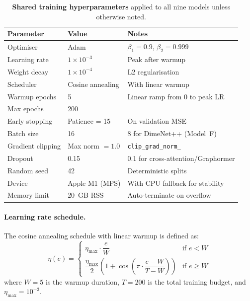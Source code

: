 \documentclass[11pt]{article}
\begin{document}
\begin{table}[H]
\small
\centering
\caption{\textbf{Shared training hyperparameters} applied to all nine models
  unless otherwise noted.}
\label{tab:si_training}
\begin{tabular}{lll}
\toprule
\textbf{Parameter} & \textbf{Value} & \textbf{Notes} \\
\midrule
Optimiser          & Adam                     & $\beta_1 = 0.9$, $\beta_2 = 0.999$ \\
Learning rate      & $1 \times 10^{-3}$       & Peak after warmup \\
Weight decay       & $1 \times 10^{-4}$       & L2 regularisation \\
Scheduler          & Cosine annealing         & With linear warmup \\
Warmup epochs      & 5                        & Linear ramp from 0 to peak LR \\
Max epochs         & 200                      & \\
Early stopping     & Patience = 15            & On validation MSE \\
Batch size         & 16                       & 8 for DimeNet++ (Model~F) \\
Gradient clipping  & Max norm $= 1.0$         & \texttt{clip\_grad\_norm\_} \\
Dropout            & 0.15                     & 0.1 for cross-attention/Graphormer \\
Random seed        & 42                       & Deterministic splits \\
Device             & Apple M1 (MPS)           & With CPU fallback for stability \\
Memory limit       & 20~GB RSS                & Auto-terminate on overflow \\
\bottomrule
\end{tabular}
\end{table}

\paragraph{Learning rate schedule.}
The cosine annealing schedule with linear warmup is defined as:
\begin{equation}
  \eta(e) = \begin{cases}
    \eta_{\max} \cdot \dfrac{e}{W} & \text{if } e < W \\[8pt]
    \dfrac{\eta_{\max}}{2}
    \left(1 + \cos\!\left(\pi \cdot \dfrac{e - W}{T - W}\right)\right)
    & \text{if } e \geq W
  \end{cases}
  \label{eq:cosine_warmup}
\end{equation}
where $W = 5$ is the warmup duration, $T = 200$ is the total training
budget, and $\eta_{\max} = 10^{-3}$.
\end{document}
